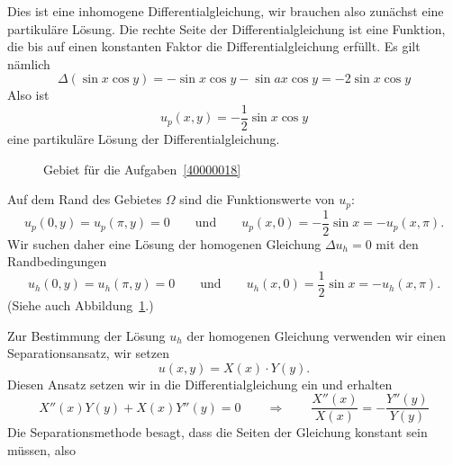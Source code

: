 \begin{loesung}
\begin{teilaufgaben}
\item
Dies ist eine inhomogene Differentialgleichung, wir brauchen also zunächst
eine partikuläre Lösung.
Die rechte Seite der Differentialgleichung ist eine Funktion, die bis auf
einen konstanten Faktor die Differentialgleichung erfüllt.
Es gilt nämlich
\[
\Delta (\sin x\cos y)
=
-\sin x\cos y - \sin ax\cos y
=
-2 \sin x\cos y
\]
Also ist
\[
u_p(x,y)
=
-\frac{1}{2} \sin x\cos y
\]
eine partikuläre Lösung der Differentialgleichung.

\item
\begin{figure}
\centering
{}
\caption{Gebiet für die Aufgaben~\ref{40000018}
\label{40000018:gebiet}}
\end{figure}
Auf dem Rand des Gebietes $\Omega$ sind die Funktionswerte von $u_p$:
\[
u_p(0,y) = u_p(\pi,y)=0
\qquad\text{und}\qquad
u_p(x,0) = -\frac12\sin x = -u_p(x,\pi).
\]
Wir suchen daher eine Lösung der homogenen Gleichung $\Delta u_h = 0$
mit den Randbedingungen
\[
u_h(0,y) = u_h(\pi,y) = 0
\qquad\text{und}\qquad
u_h(x,0) = \frac12\sin x = -u_h(x,\pi).
\]
(Siehe auch Abbildung~\ref{40000018:gebiet}.)
\item
Zur Bestimmung der Lösung $u_h$ der homogenen Gleichung verwenden wir einen
Separationsansatz, wir setzen
\[
u(x,y) = X(x)\cdot Y(y).
\]
Diesen Ansatz setzen wir in die Differentialgleichung ein und erhalten
\[
X''(x)Y(y) + X(x)Y''(y)=0
\qquad\Rightarrow\qquad
\frac{X''(x)}{X(x)} = -\frac{Y''(y)}{Y(y)}
\]
Die Separationsmethode besagt, dass die Seiten der Gleichung konstant
sein müssen, also

\end{teilaufgaben}
\end{loesung}
